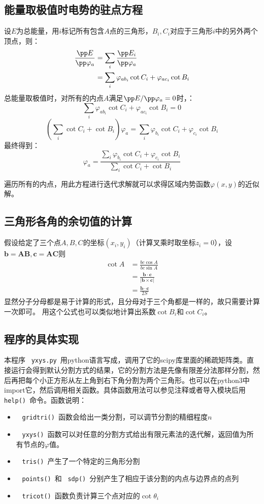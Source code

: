 \documentclass{article}
\newcommand{\comm}[1]{\ {\color{blue} \texttt{#1}}\ }
\begin{document}
\subsection{能量取极值时电势的驻点方程}
设$E$为总能量，用$i$标记所有包含$A$点的三角形，$B_i, C_i$对应于三角形$i$中的另外两个顶点，则：
\begin{align}
 \frac{\pp E}{\pp \varphi_a}&=\sum_i\frac{\pp  E_i}{\pp \varphi_a}\\
 &=\sum_i \varphi_{ab_i}\cot C_i+\varphi_{ac_i}\cot B_i
\end{align}
总能量取极值时，对所有的内点$A$满足$\pp E/\pp \varphi_a=0$时，：
\[\sum_i \varphi_{ab_i}\cot C_i+\varphi_{ac_i}\cot B_i=0\]
\[\left(\sum_i\cot C_i+\cot B_i\right)\varphi_{a}=\sum_i \varphi_{b_i}\cot C_i+\varphi_{c_i}\cot B_i\]
最终得到：
\[\varphi_a=\frac{\sum_i \varphi_{b_i}\cot C_i+\varphi_{c_i}\cot B_i}{\sum_i\cot C_i+\cot B_i}
\]

遍历所有的内点，用此方程进行迭代求解就可以求得区域内势函数$\varphi(x,y)$的近似解。
\subsection{三角形各角的余切值的计算}
假设给定了三个点$A,B,C$的坐标$(x_i,y_i)$（计算叉乘时取坐标$z_i=0$），设$\bm b=\bm{AB}, \bm c=\bm{AC}$则
\begin{align}
 \cot A&=\frac{bc\cos A}{bc\sin A}\\
       &=\frac{\bm{b\cdot c}}{|\bm{b\times c}|}\\
       &=\frac{\bm{b\cdot c}}{2S}
\end{align}
显然分子分母都是易于计算的形式，且分母对于三个角都是一样的，故只需要计算一次即可。
用这个公式也可以类似地计算出系数$\cot B_i$和$\cot C_i$。
\subsection{程序的具体实现}
本程序\comm{yxys.py}用python语言写成，调用了它的scipy库里面的稀疏矩阵类。直接运行会得到默认分割方式的结果，它的分割方法是先像有限差分法那样分割，然后再把每个小正方形从左上角到右下角分割为两个三角形。也可以在python3中import它，然后调用相关函数。具体函数用法可以参见注释或者导入模块后用\comm{help()}命令。函数说明：
\begin{itemize}
 \item \comm{gridtri()}函数会给出一类分割，可以调节分割的精细程度$n$
 \item \comm{yxys()}函数可以对任意的分割方式给出有限元素法的迭代解，返回值为所有节点的$\varphi$值。
 \item \comm{tris()}产生了一个特定的三角形分割
 \item \comm{points()}和\comm{sdp()}分别产生了相应于该分割的内点与边界点的点列
 \item \comm{tricot()}函数负责计算三个点对应的$\cot \theta_i$
\end{itemize}
\end{document}
